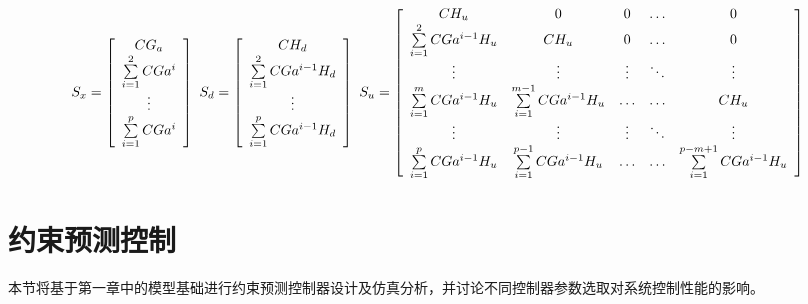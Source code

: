 \documentclass[UTF8]{article}
\begin{document}
\[
    S_{x}=
    \left[
        \begin{array}{c}
            CG_{a} \\ 
            \sum\limits_{i=1}^{2}CGa^{i} \\
            \vdots  \\
            \sum\limits_{i=1}^{p}CGa^{i} \\
        \end{array}
    \right]
    \hbox{  }
    S_{d}=
    \left[
        \begin{array}{c}
            CH_{d} \\ 
            \sum\limits_{i=1}^{2}CGa^{i-1}H_{d} \\
            \vdots  \\
            \sum\limits_{i=1}^{p}CGa^{i-1}H_{d} \\
        \end{array}
    \right]
    \hbox{  }
    S_{u}=
    \left[
        \begin{array}{ccccc}
            CH_{u}&0&0&\ldots&0\\
            \sum\limits_{i=1}^{2}CGa^{i-1}H_{u}&CH_{u}&0&\ldots&0\\
            \vdots&\vdots&\vdots&\ddots&\vdots\\
            \sum\limits_{i=1}^{m}CGa^{i-1}H_{u}&\sum\limits_{i=1}^{m-1}CGa^{i-1}H_{u}&\ldots&\ldots&CH_{u}\\
            \vdots&\vdots&\vdots&\ddots&\vdots\\
            \sum\limits_{i=1}^{p}CGa^{i-1}H_{u}&\sum\limits_{i=1}^{p-1}CGa^{i-1}H_{u}&\ldots&\ldots&\sum\limits_{i=1}^{p-m+1}CGa^{i-1}H_{u}\\
        \end{array}
    \right]
\]

\section{约束预测控制}
本节将基于第一章中的模型基础进行约束预测控制器设计及仿真分析，并讨论不同控制器参数选取对系统控制性能的影响。
\end{document}
